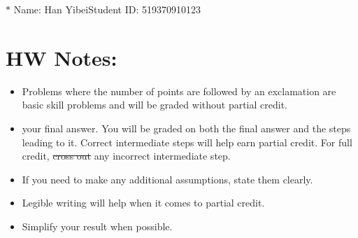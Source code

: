 \documentclass[12pt,a4paper]{article}
\begin{document}
\noindent

\noindent{}

\begin{center}

\footnotesize{\color{blue}$*$ Name: Han Yibei\quad\quad\quad\quad\quad Student ID: 519370910123}
\end{center}

\section*{HW Notes:}
\begin{itemize}
    \item Problems where the number of points are followed by an exclamation are basic skill problems and will be graded without partial credit.
    \item {} your final answer. You will be graded on both the final answer and the steps leading to it. Correct intermediate steps will help earn partial credit.
    For full credit, \sout{cross out} any incorrect intermediate step.
    \item If you need to make any additional assumptions, state them clearly.
    \item Legible writing will help when it comes to partial credit.
    \item Simplify your result when possible.
\end{itemize}
\end{document}
